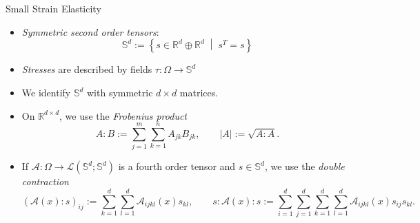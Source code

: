\documentclass[10pt,aspectratio=169]{beamer}
\def\R{{\mathbb R}}
\def\S{{\mathbb S}}
\def\cA{{\mathcal A}}
\def\cL{{\mathcal L}}
\begin{document}
\begin{frame}{Small Strain Elasticity}
	\begin{itemize}
		\item {\em Symmetric second order tensors}:
		      \begin{equation*}
			      \S^d:=\left\{s\in\R^d\oplus\R^d\;\middle|\;s^T = s\right\}
		      \end{equation*}
		\item {\em Stresses} are described by fields $\tau:\Omega\to\S^d$
		\item We identify $\S^d$ with symmetric $d\times d$ matrices.
		\item On $\R^{d\times d}$, we use the {\em Frobenius product}
		      \begin{equation*}
			      A:B := \sum_{j=1}^m\sum_{k=1}^n A_{jk}B_{jk},
			      \qquad
			      |A| := \sqrt{A:A}.
		      \end{equation*}
		\item If $\cA:\Omega\to\cL(\S^d;\S^d)$ is a fourth order tensor and $s\in\S^d$, we use the {\em double contraction}
		      \begin{equation*}
			      (\cA(x):s)_{ij}:=\sum_{k = 1}^d \sum_{l = 1}^d \cA_{ijkl}(x)s_{kl},
			      \qquad
			      s:\cA(x):s:=\sum_{i = 1}^d \sum_{j = 1}^d \sum_{k = 1}^d \sum_{l = 1}^d\cA_{ijkl}(x)s_{ij}s_{kl}.
		      \end{equation*}
	\end{itemize}
\end{frame}
\end{document}

